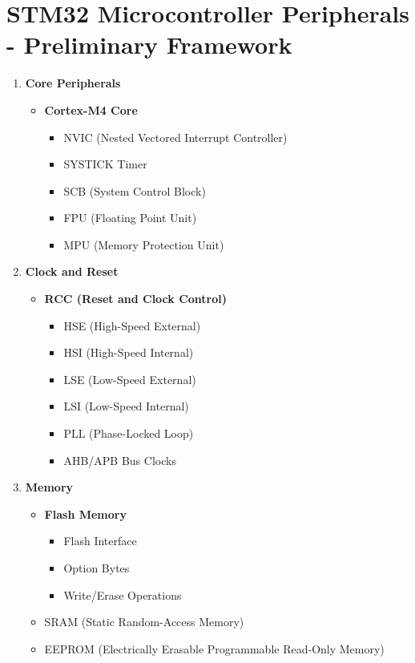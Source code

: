 \documentclass{article}
\begin{document}
\section*{STM32 Microcontroller Peripherals - Preliminary Framework}

\begin{enumerate}[label=\textbf{\arabic*.}]
    
    \item \textbf{Core Peripherals}
    \begin{itemize}
        \item \textbf{Cortex-M4 Core}
        \begin{itemize}
            \item NVIC (Nested Vectored Interrupt Controller)
            \item SYSTICK Timer
            \item SCB (System Control Block)
            \item FPU (Floating Point Unit)
            \item MPU (Memory Protection Unit)
        \end{itemize}
    \end{itemize}
    
    \item \textbf{Clock and Reset}
    \begin{itemize}
        \item \textbf{RCC (Reset and Clock Control)}
        \begin{itemize}
            \item HSE (High-Speed External)
            \item HSI (High-Speed Internal)
            \item LSE (Low-Speed External)
            \item LSI (Low-Speed Internal)
            \item PLL (Phase-Locked Loop)
            \item AHB/APB Bus Clocks
        \end{itemize}
    \end{itemize}
    
    \item \textbf{Memory}
    \begin{itemize}
        \item \textbf{Flash Memory}
        \begin{itemize}
            \item Flash Interface
            \item Option Bytes
            \item Write/Erase Operations
        \end{itemize}
        \item SRAM (Static Random-Access Memory)
        \item EEPROM (Electrically Erasable Programmable Read-Only Memory)
    \end{itemize}
    

\end{enumerate}
\end{document}
